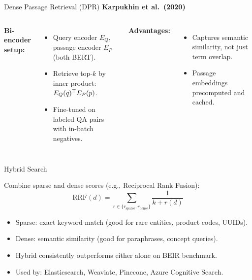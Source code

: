 \documentclass[aspectratio=169,10pt]{beamer}
\begin{document}
\begin{frame}{Dense Passage Retrieval (DPR)}
  \textbf{Karpukhin et al.\ (2020)}~\cite{karpukhin2020dpr}
  \vspace{0.4em}
  \begin{columns}[T]
      \textbf{Bi-encoder setup:}
      \begin{itemize}
        \item Query encoder $E_Q$, passage encoder $E_P$ (both BERT).
        \item Retrieve top-$k$ by inner product: $E_Q(q)^{\top} E_P(p)$.
        \item Fine-tuned on labeled QA pairs with in-batch negatives.
      \end{itemize}
      \vspace{0.4em}
      \textbf{Advantages:}
      \begin{itemize}
        \item Captures semantic similarity, not just term overlap.
        \item Passage embeddings precomputed and cached.
      \end{itemize}
  \end{columns}
\end{frame}

\begin{frame}{Hybrid Search}
  \begin{tcolorbox}[hitbox, title=Hybrid Search = BM25 + Dense]
    Combine sparse and dense scores (e.g., Reciprocal Rank Fusion):
    \[
      \text{RRF}(d) = \sum_{r \in \{r_\text{sparse}, r_\text{dense}\}} \frac{1}{k + r(d)}
    \]
  \end{tcolorbox}
  \vspace{0.4em}
  \begin{itemize}
    \item Sparse: exact keyword match (good for rare entities, product codes, UUIDs).
    \item Dense: semantic similarity (good for paraphrases, concept queries).
    \item Hybrid consistently outperforms either alone on BEIR benchmark.
    \item Used by: Elasticsearch, Weaviate, Pinecone, Azure Cognitive Search.
  \end{itemize}
\end{frame}
\end{document}
